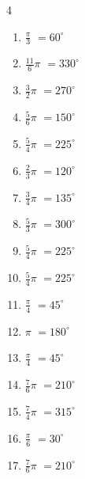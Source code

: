 \begin{multicols}{4}
\begin{enumerate}
  \item $\displaystyle \frac{\pi}{3}$
        $\displaystyle =60^{\circ}$

  \item $\displaystyle \frac{11}{6}\pi$
        $\displaystyle =330^{\circ}$

  \item $\displaystyle \frac{3}{2}\pi$
        $\displaystyle =270^{\circ}$

  \item $\displaystyle \frac{5}{6}\pi$
        $\displaystyle =150^{\circ}$

  \item $\displaystyle \frac{5}{4}\pi$
        $\displaystyle =225^{\circ}$

  \item $\displaystyle \frac{2}{3}\pi$
        $\displaystyle =120^{\circ}$

  \item $\displaystyle \frac{3}{4}\pi$
        $\displaystyle =135^{\circ}$

  \item $\displaystyle \frac{5}{3}\pi$
        $\displaystyle =300^{\circ}$

  \item $\displaystyle \frac{5}{4}\pi$
        $\displaystyle =225^{\circ}$

  \item $\displaystyle \frac{5}{4}\pi$
        $\displaystyle =225^{\circ}$

  \item $\displaystyle \frac{\pi}{4}$
        $\displaystyle =45^{\circ}$

  \item $\displaystyle \pi$
        $\displaystyle =180^{\circ}$

  \item $\displaystyle \frac{\pi}{4}$
        $\displaystyle =45^{\circ}$

\columnbreak %

  \item $\displaystyle \frac{7}{6}\pi$
        $\displaystyle =210^{\circ}$

  \item $\displaystyle \frac{7}{4}\pi$
        $\displaystyle =315^{\circ}$

  \item $\displaystyle \frac{\pi}{6}$
        $\displaystyle =30^{\circ}$

  \item $\displaystyle \frac{7}{6}\pi$
        $\displaystyle =210^{\circ}$


\end{enumerate}
\end{multicols}
